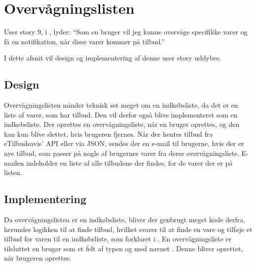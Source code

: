\section{Overvågningslisten}

User story 9, i , lyder: ``Som en bruger vil jeg kunne overvåge specifikke varer og få en notifikation, når disse varer kommer på tilbud.''

I dette afsnit vil design og implementering af denne user story uddybes.

\subsection{Design}
Overvågningslisten minder teknisk set meget om en indkøbsliste, da det er en liste af varer, som har tilbud.
Den vil derfor også blive implementeret som en indkøbsliste. 
Der oprettes en overvågningsliste, når en bruger oprettes, og den kan kun blive slettet, hvis brugeren fjernes.
Når der hentes tilbud fra eTilbudsavis' API eller via JSON, sendes der en e-mail til brugerne, hvis der er nye tilbud, som passer på nogle af brugernes varer fra deres overvågningsliste. 
E-mailen indeholder en liste af alle tilbudene der findes, for de varer der er på listen.

\subsection{Implementering} 
Da overvågningslisten er en indkøbsliste, bliver der genbrugt meget kode derfra, herunder logikken til at finde tilbud, hvilket svarer til at finde en vare og tilføje et tilbud for varen til en indkøbsliste, som forklaret i .
En overvågningsliste er tilsluttet en bruger som et felt af typen  og med navnet . 
Denne  bliver oprettet, når brugeren oprettes.

